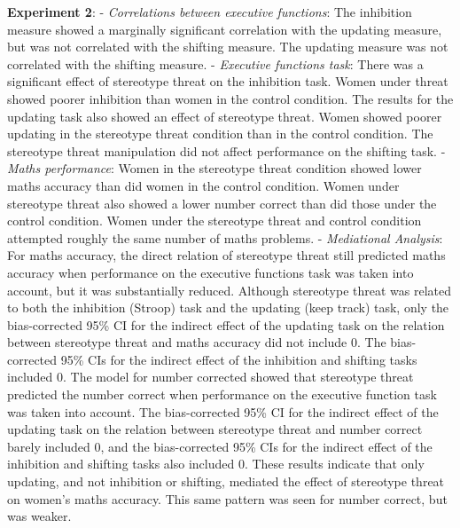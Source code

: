 \documentclass[
  doc, a4paper]{apa7}
\begin{document}
\textbf{Experiment 2}:
- \emph{Correlations between executive functions}: The inhibition measure showed a marginally significant correlation with the updating measure, but was not correlated with the shifting measure. The updating measure was not correlated with the shifting measure.
- \emph{Executive functions task}: There was a significant effect of stereotype threat on the inhibition task. Women under threat showed poorer inhibition than women in the control condition. The results for the updating task also showed an effect of stereotype threat. Women showed poorer updating in the stereotype threat condition than in the control condition. The stereotype threat manipulation did not affect performance on the shifting task.
- \emph{Maths performance}: Women in the stereotype threat condition showed lower maths accuracy than did women in the control condition. Women under stereotype threat also showed a lower number correct than did those under the control condition. Women under the stereotype threat and control condition attempted roughly the same number of maths problems.
- \emph{Mediational Analysis}: For maths accuracy, the direct relation of stereotype threat still predicted maths accuracy when performance on the executive functions task was taken into account, but it was substantially reduced. Although stereotype threat was related to both the inhibition (Stroop) task and the updating (keep track) task, only the bias-corrected 95\% CI for the indirect effect of the updating task on the relation between stereotype threat and maths accuracy did not include 0. The bias-corrected 95\% CIs for the indirect effect of the inhibition and shifting tasks included 0. The model for number corrected showed that stereotype threat predicted the number correct when performance on the executive function task was taken into account. The bias-corrected 95\% CI for the indirect effect of the updating task on the relation between stereotype threat and number correct barely included 0, and the bias-corrected 95\% CIs for the indirect effect of the inhibition and shifting tasks also included 0. These results indicate that only updating, and not inhibition or shifting, mediated the effect of stereotype threat on women's maths accuracy. This same pattern was seen for number correct, but was weaker.
\end{document}

